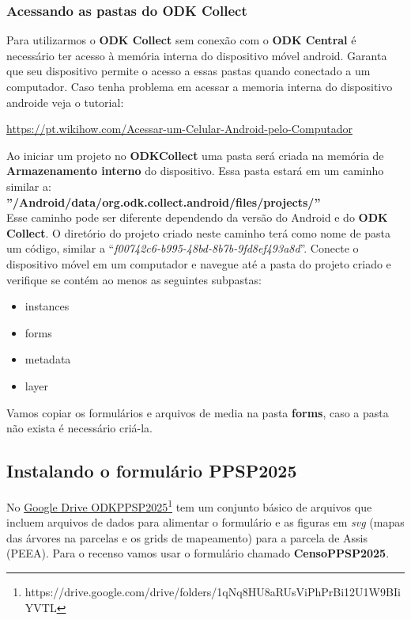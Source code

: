 \documentclass[12pt, a4paper]{article} %
\begin{document}
\subsubsection{Acessando as pastas do ODK Collect}


Para utilizarmos o \textbf{ODK Collect} sem conexão com o \textbf{ODK Central} é necessário ter acesso à memória interna do dispositivo móvel android. Garanta que seu dispositivo permite o acesso a essas pastas quando conectado a um computador. Caso tenha problema em acessar a memoria interna do dispositivo androide veja o tutorial:

\url{https://pt.wikihow.com/Acessar-um-Celular-Android-pelo-Computador} 

Ao iniciar um projeto no \textbf{ODKCollect} uma pasta será criada na memória de \textbf{Armazenamento interno} do dispositivo. Essa pasta estará em um caminho similar a:\\

\textbf{''/Android/data/org.odk.collect.android/files/projects/''}\\

Esse caminho pode ser diferente dependendo da versão do Android e do \textbf{ODK Collect}. O diretório do projeto criado neste caminho terá como nome de pasta um código, similar a ``\textit{f00742c6-b995-48bd-8b7b-9fd8ef493a8d}''.  Conecte o dispositivo móvel em um computador e navegue até a pasta do projeto criado e verifique se contém ao menos as seguintes subpastas:

\begin{itemize}
\item instances
\item forms
\item metadata
\item layer
\end{itemize}




Vamos copiar os formulários e arquivos de media na pasta  \textbf{forms}, caso a pasta não exista é necessário criá-la. 

\subsection{Instalando o formulário PPSP2025}
\label{sec:instalando_o_formulario_peic}

No \href{https://drive.google.com/drive/folders/1qNq8HU8aRUsViPhPrBi12U1W9BIiYVTL?usp=sharing}{Google Drive ODKPPSP2025}\footnote{https://drive.google.com/drive/folders/1qNq8HU8aRUsViPhPrBi12U1W9BIiYVTL} tem um conjunto básico de arquivos que incluem arquivos de dados para alimentar o formulário e as figuras em \textit{svg} (mapas das árvores na parcelas e os grids de mapeamento) para a parcela de Assis (PEEA). Para o recenso vamos usar o formulário chamado \textbf{CensoPPSP2025}.
\end{document}
